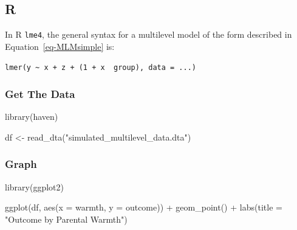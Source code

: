 \documentclass[
  letterpaper,
  DIV=11,
  numbers=noendperiod]{scrreprt}
\newenvironment{Shaded}{\begin{snugshade}}{\end{snugshade}}
\newcommand{\AttributeTok}[1]{\textcolor[rgb]{0.40,0.45,0.13}{#1}}
\newcommand{\FunctionTok}[1]{\textcolor[rgb]{0.28,0.35,0.67}{#1}}
\newcommand{\NormalTok}[1]{\textcolor[rgb]{0.00,0.23,0.31}{#1}}
\newcommand{\OtherTok}[1]{\textcolor[rgb]{0.00,0.23,0.31}{#1}}
\newcommand{\SpecialCharTok}[1]{\textcolor[rgb]{0.37,0.37,0.37}{#1}}
\newcommand{\StringTok}[1]{\textcolor[rgb]{0.13,0.47,0.30}{#1}}
\begin{document}
\subsection{R}

In R \texttt{lme4}, the general syntax for a multilevel model of the
form described in Equation~\ref{eq-MLMsimple} is:

\texttt{lmer(y\ \textasciitilde{}\ x\ +\ z\ +\ (1\ +\ x\ \textbar{}\textbar{}\ group),\ data\ =\ ...)}

\hypertarget{get-the-data-1}{%
\subsubsection{Get The Data}\label{get-the-data-1}}

\begin{Shaded}
\begin{Highlighting}[]
\FunctionTok{library}\NormalTok{(haven)}

\NormalTok{df }\OtherTok{\textless{}{-}} \FunctionTok{read\_dta}\NormalTok{(}\StringTok{"simulated\_multilevel\_data.dta"}\NormalTok{)}
\end{Highlighting}
\end{Shaded}

\hypertarget{graph-1}{%
\subsubsection{Graph}\label{graph-1}}

\begin{Shaded}
\begin{Highlighting}[]
\FunctionTok{library}\NormalTok{(ggplot2)}

\FunctionTok{ggplot}\NormalTok{(df,}
       \FunctionTok{aes}\NormalTok{(}\AttributeTok{x =}\NormalTok{ warmth,}
           \AttributeTok{y =}\NormalTok{ outcome)) }\SpecialCharTok{+}
  \FunctionTok{geom\_point}\NormalTok{() }\SpecialCharTok{+}
  \FunctionTok{labs}\NormalTok{(}\AttributeTok{title =} \StringTok{"Outcome by Parental Warmth"}\NormalTok{)}
\end{Highlighting}
\end{Shaded}
\end{document}
